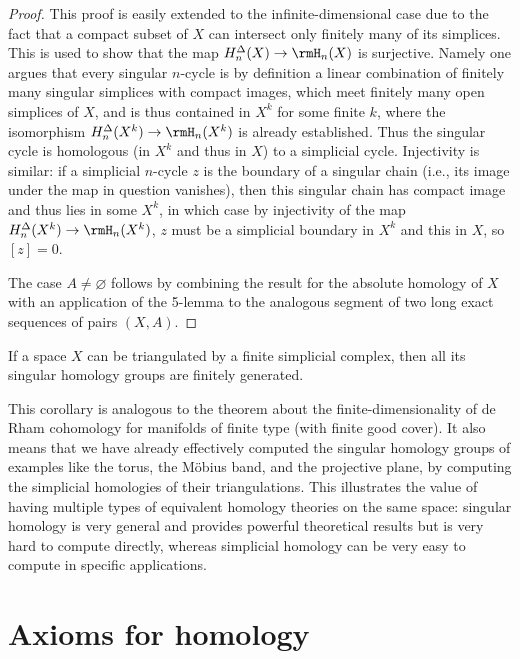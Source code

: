 \begin{proof}
    This proof is easily extended to the infinite-dimensional case due to the fact that a compact subset of $X$ can intersect only finitely many of its simplices. This is used to show that the map $H^\Delta_n(X)\to \rmH_n(X)$ is surjective. Namely one argues that every singular $n$-cycle is by definition a linear combination of finitely many singular simplices with compact images, which meet finitely many open simplices of $X$, and is thus contained in $X^k$ for some finite $k$, where the isomorphism $H^\Delta_n(X^k)\to \rmH_n(X^k)$ is already established. Thus the singular cycle is homologous (in $X^k$ and thus in $X$) to a simplicial cycle. Injectivity is similar: if a simplicial $n$-cycle $z$ is the boundary of a singular chain (i.e., its image under the map in question vanishes), then this singular chain has compact image and thus lies in some $X^k$, in which case by injectivity of the map $H^\Delta_n(X^k)\to \rmH_n(X^k)$, $z$ must be a simplicial boundary in $X^k$ and this in $X$, so $[z]=0$. 
    
    The case $A\neq\varnothing$ follows by combining the result for the absolute homology of $X$ with an application of the 5-lemma to the analogous segment of two long exact sequences of pairs $(X,A)$.
\end{proof}

\begin{cor}
    If a space $X$ can be triangulated by a finite simplicial complex, then all its singular homology groups are finitely generated.
\end{cor}

This corollary is analogous to the theorem about the finite-dimensionality of de Rham cohomology for manifolds of finite type (with finite good cover). It also means that we have already effectively computed the singular homology groups of examples like the torus, the M\"obius band, and the projective plane, by computing the simplicial homologies of their triangulations. This illustrates the value of having multiple types of equivalent homology theories on the same space: singular homology is very general and provides powerful theoretical results but is very hard to compute directly, whereas simplicial homology can be very easy to compute in specific applications.







\section{Axioms for homology}

